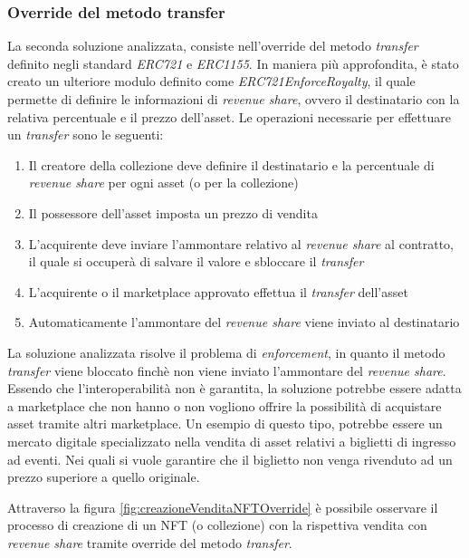 \subsubsection{Override del metodo transfer}

La seconda soluzione analizzata, consiste nell'override del metodo \textit{transfer} definito negli standard \textit{ERC721} e \textit{ERC1155}. In maniera più approfondita, è stato creato un ulteriore modulo definito come \textit{ERC721EnforceRoyalty}, il quale permette di definire le informazioni di \textit{revenue share}, ovvero il destinatario con la relativa percentuale e il prezzo dell'asset. Le operazioni necessarie per effettuare un \textit{transfer} sono le seguenti:

\begin{enumerate}
    \item Il creatore della collezione deve definire il destinatario e la percentuale di \textit{revenue share} per ogni asset (o per la collezione)
    \item Il possessore dell'asset imposta un prezzo di vendita
    \item L'acquirente deve inviare l'ammontare relativo al \textit{revenue share} al contratto, il quale si occuperà di salvare il valore e sbloccare il \textit{transfer}
    \item L'acquirente o il marketplace approvato effettua il \textit{transfer} dell'asset
    \item Automaticamente l'ammontare del \textit{revenue share} viene inviato al destinatario
\end{enumerate}

La soluzione analizzata risolve il problema di \textit{enforcement}, in quanto il metodo \textit{transfer} viene bloccato finchè non viene inviato l'ammontare del \textit{revenue share}. Essendo che l'interoperabilità non è garantita, la soluzione potrebbe essere adatta a marketplace che non hanno o non vogliono offrire la possibilità di acquistare asset tramite altri marketplace. Un esempio di questo tipo, potrebbe essere un mercato digitale specializzato nella vendita di asset relativi a biglietti di ingresso ad eventi. Nei quali si vuole garantire che il biglietto non venga rivenduto ad un prezzo superiore a quello originale.

Attraverso la figura \ref{fig:creazioneVenditaNFTOverride} è possibile osservare il processo di creazione di un NFT (o collezione) con la rispettiva vendita con \textit{revenue share} tramite override del metodo \textit{transfer}.


